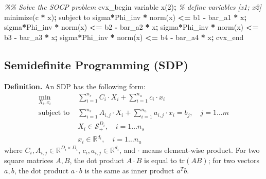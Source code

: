 \documentclass[
]{book}
\newenvironment{Shaded}{\begin{snugshade}}{\end{snugshade}}
\newcommand{\CommentTok}[1]{\textcolor[rgb]{0.56,0.35,0.01}{\textit{#1}}}
\newcommand{\FloatTok}[1]{\textcolor[rgb]{0.00,0.00,0.81}{#1}}
\newcommand{\NormalTok}[1]{#1}
\newcommand{\OperatorTok}[1]{\textcolor[rgb]{0.81,0.36,0.00}{\textbf{#1}}}
\newcommand{\VariableTok}[1]{\textcolor[rgb]{0.00,0.00,0.00}{#1}}
\theoremstyle{definition}
\theoremstyle{definition}
\theoremstyle{definition}
\theoremstyle{definition}
\theoremstyle{remark}
\begin{document}
\begin{Shaded}
\begin{Highlighting}[]
\CommentTok{\%\% Solve the SOCP problem}
\VariableTok{cvx\_begin}
    \VariableTok{variable} \VariableTok{x}\NormalTok{(}\FloatTok{2}\NormalTok{)}\OperatorTok{;} \CommentTok{\% define variables [x1; x2]}
    \VariableTok{minimize}\NormalTok{(}\VariableTok{c}\OperatorTok{\textquotesingle{}} \OperatorTok{*} \VariableTok{x}\NormalTok{)}\OperatorTok{;} 
    \VariableTok{subject} \VariableTok{to}
        \VariableTok{sigma}\OperatorTok{*}\VariableTok{Phi\_inv} \OperatorTok{*} \VariableTok{norm}\NormalTok{(}\VariableTok{x}\NormalTok{) }\OperatorTok{\textless{}=} \VariableTok{b1} \OperatorTok{{-}} \VariableTok{bar\_a1}\OperatorTok{\textquotesingle{}} \OperatorTok{*} \VariableTok{x}\OperatorTok{;}
        \VariableTok{sigma}\OperatorTok{*}\VariableTok{Phi\_inv} \OperatorTok{*} \VariableTok{norm}\NormalTok{(}\VariableTok{x}\NormalTok{) }\OperatorTok{\textless{}=} \VariableTok{b2} \OperatorTok{{-}} \VariableTok{bar\_a2}\OperatorTok{\textquotesingle{}} \OperatorTok{*} \VariableTok{x}\OperatorTok{;}
        \VariableTok{sigma}\OperatorTok{*}\VariableTok{Phi\_inv} \OperatorTok{*} \VariableTok{norm}\NormalTok{(}\VariableTok{x}\NormalTok{) }\OperatorTok{\textless{}=} \VariableTok{b3} \OperatorTok{{-}} \VariableTok{bar\_a3}\OperatorTok{\textquotesingle{}} \OperatorTok{*} \VariableTok{x}\OperatorTok{;}
        \VariableTok{sigma}\OperatorTok{*}\VariableTok{Phi\_inv} \OperatorTok{*} \VariableTok{norm}\NormalTok{(}\VariableTok{x}\NormalTok{) }\OperatorTok{\textless{}=} \VariableTok{b4} \OperatorTok{{-}} \VariableTok{bar\_a4}\OperatorTok{\textquotesingle{}} \OperatorTok{*} \VariableTok{x}\OperatorTok{;}
\VariableTok{cvx\_end}
\end{Highlighting}
\end{Shaded}

\hypertarget{semidefinite-programming-sdp}{%
\subsection{Semidefinite Programming (SDP)}\label{semidefinite-programming-sdp}}

\textbf{Definition.} An SDP has the following form:
\begin{align}
   \label{eq:app-sdpdef}
   \min_{X_i, x_i} \ & \sum_{i=1}^{n_s} C_i \cdot X_i + \sum_{i=1}^{n_u} c_i \cdot x_i \\
   \text{subject to } & \sum_{i=1}^{n_s} A_{i,j} \cdot X_i + \sum_{i=1}^{n_u} a_{i,j} \cdot x_i = b_j, \quad j = 1 \dots m \\
   & X_i \in \mathcal{S}_+^{D_i}, \quad i = 1 \dots n_s \\
   & x_i \in \mathbb{R}^{d_i}, \quad i = 1 \dots n_u  
\end{align}
where \(C_i, A_{i, j} \in \mathbb{R}^{D_i \times D_i}\), \(c_i, a_{i, j} \in \mathbb{R}^{d_i}\), and \(\cdot\) means element-wise product. For two square matrices \(A, B\), the dot product \(A \cdot B\) is equal to \(\text{tr}(A B)\); for two vectors \(a, b\), the dot product \(a \cdot b\) is the same as inner product \(a^T b\).
\end{document}
